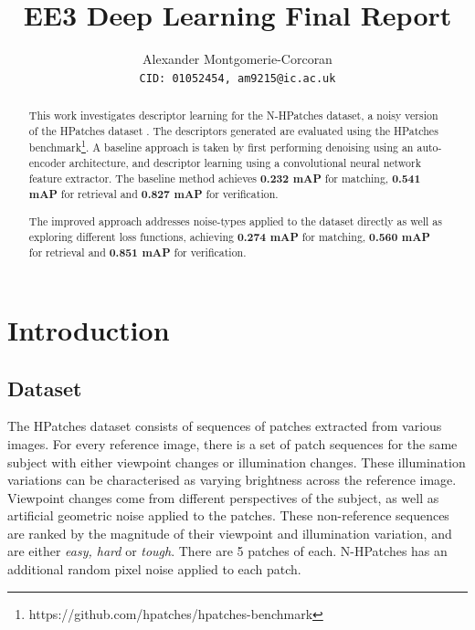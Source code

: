 \documentclass[10pt,twocolumn,letterpaper]{article}
\begin{document}
\vspace{-0.5cm}


\title{EE3 Deep Learning Final Report}
\vspace{-0.5cm}

\author{Alexander Montgomerie-Corcoran\\
{\tt\small CID: 01052454, am9215@ic.ac.uk}
}

\maketitle


\begin{abstract}
   This work investigates descriptor learning for the N-HPatches dataset, a noisy version of the HPatches dataset \cite{hpatches_2017_cvpr}. The descriptors generated are evaluated using the HPatches benchmark\footnote{https://github.com/hpatches/hpatches-benchmark}.
   A baseline approach is taken by first performing denoising using an auto-encoder architecture, and descriptor learning using a convolutional neural network feature extractor. The baseline method achieves \textbf{0.232 mAP} for matching, \textbf{0.541 mAP} for retrieval and \textbf{0.827 mAP} for verification.
   
   The improved approach addresses noise-types applied to the dataset directly as well as exploring different loss functions, achieving \textbf{0.274 mAP} for matching, \textbf{0.560 mAP} for retrieval and \textbf{0.851 mAP} for verification.
\end{abstract}


\section{Introduction}

\subsection{Dataset}


The HPatches dataset consists of sequences of patches extracted from various images. For every reference image, there is a set of patch sequences for the same subject with either viewpoint changes or illumination changes. These illumination variations can be characterised as varying brightness across the reference image. Viewpoint changes come from different perspectives of the subject, as well as artificial geometric noise applied to the patches. These non-reference sequences are ranked by the magnitude of their viewpoint and illumination variation, and are either \textit{easy, hard} or \textit{tough}. There are 5 patches of each. N-HPatches has an additional random pixel noise applied to each patch.
\end{document}
